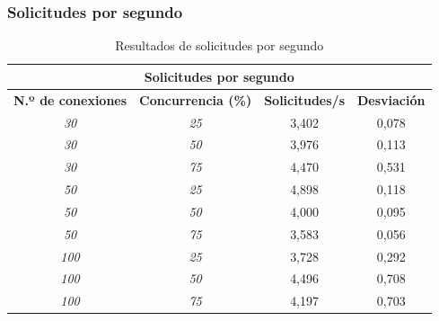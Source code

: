 \subsubsection{Solicitudes por segundo}
\begin{table}[!ht]
	\begin{center}
		\begin{tabular}{|c|c|c|c|}
			\hline
			\multicolumn{4}{|c|}{{\bf Solicitudes por segundo}}                                                   \\ \hline
			{\bf N.º de conexiones} & {\bf Concurrencia (\%)} & {\bf Solicitudes/s} & {\bf Desviación} \\ \hline
			{\it 30}                & {\it 25}                & 3,402                          & 0,078            \\ \hline
			{\it 30}                & {\it 50}                & 3,976                          & 0,113            \\ \hline
			{\it 30}                & {\it 75}                & 4,470                          & 0,531            \\ \hline
			{\it 50}                & {\it 25}                & 4,898                          & 0,118            \\ \hline
			{\it 50}                & {\it 50}                & 4,000                          & 0,095            \\ \hline
			{\it 50}                & {\it 75}                & 3,583                          & 0,056            \\ \hline
			{\it 100}               & {\it 25}                & 3,728                          & 0,292            \\ \hline
			{\it 100}               & {\it 50}                & 4,496                          & 0,708            \\ \hline
			{\it 100}               & {\it 75}                & 4,197                          & 0,703            \\ \hline
		\end{tabular}
		\caption{Resultados de solicitudes por segundo}
		\label{table:rss}
	\end{center}
\end{table}

